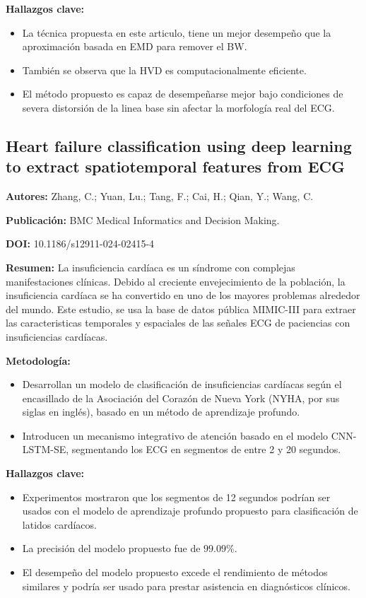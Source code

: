 \documentclass[12pt,letterpaper,oneside,openright]{book}
\begin{document}
\textbf{Hallazgos clave:}
\begin{itemize}
	\item La técnica propuesta en este articulo, tiene un mejor desempeño que la aproximación basada en EMD para remover el BW.
	\item También se observa que la HVD es computacionalmente eficiente. 
	\item El método propuesto es capaz de desempeñarse mejor bajo condiciones de severa distorsión de la linea base sin afectar la morfología real del ECG.
\end{itemize}

\subsection{Heart failure classification using deep learning to extract spatiotemporal features from ECG \cite{Zhang24}}
\textbf{Autores:} Zhang, C.; Yuan, Lu.; Tang, F.; Cai, H.; Qian, Y.; Wang, C.

\textbf{Publicación:} BMC Medical Informatics and Decision Making.

\textbf{DOI:} 10.1186/s12911-024-02415-4

\textbf{Resumen:} La insuficiencia cardíaca es un síndrome con complejas manifestaciones clínicas. Debido al creciente envejecimiento de la población, la insuficiencia cardíaca se ha convertido en uno de los mayores problemas alrededor del mundo. Este estudio, se usa la base de datos pública MIMIC-III para extraer las caracteristicas temporales y espaciales de las señales ECG de paciencias con insuficiencias cardíacas.

\textbf{Metodología:}
\begin{itemize}
	\item Desarrollan un modelo de clasificación de insuficiencias cardíacas según el encasillado de la Asociación del Corazón de Nueva York (NYHA, por sus siglas en inglés), basado en un método de aprendizaje profundo.
	\item Introducen un mecanismo integrativo de atención basado en el modelo CNN-LSTM-SE, segmentando los ECG en segmentos de entre 2 y 20 segundos.
\end{itemize}

\textbf{Hallazgos clave:}
\begin{itemize}
	\item Experimentos mostraron que los segmentos de 12 segundos podrían ser usados con el modelo de aprendizaje profundo propuesto para clasificación de latidos cardíacos.
	\item La precisión del modelo propuesto fue de $99.09\%$.
	\item El desempeño del modelo propuesto excede el rendimiento de métodos similares y podría ser usado para prestar asistencia en diagnósticos clínicos.
\end{itemize}
\end{document}
